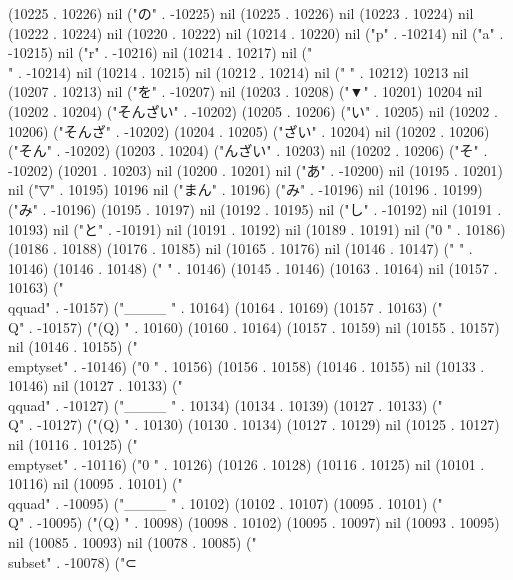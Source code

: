 (10225 . 10226) nil ("の" . -10225) nil (10225 . 10226) nil (10223 . 10224) nil (10222 . 10224) nil (10220 . 10222) nil (10214 . 10220) nil ("p" . -10214) nil ("a" . -10215) nil ("r" . -10216) nil (10214 . 10217) nil ("\\" . -10214) nil (10214 . 10215) nil (10212 . 10214) nil (" " . 10212) 10213 nil (10207 . 10213) nil ("を" . -10207) nil (10203 . 10208) ("▼" . 10201) 10204 nil (10202 . 10204) ("そんざい" . -10202) (10205 . 10206) ("い" . 10205) nil (10202 . 10206) ("そんざ" . -10202) (10204 . 10205) ("ざい" . 10204) nil (10202 . 10206) ("そん" . -10202) (10203 . 10204) ("んざい" . 10203) nil (10202 . 10206) ("そ" . -10202) (10201 . 10203) nil (10200 . 10201) nil ("あ" . -10200) nil (10195 . 10201) nil ("▽" . 10195) 10196 nil ("まん" . 10196) ("み" . -10196) nil (10196 . 10199) ("み" . -10196) (10195 . 10197) nil (10192 . 10195) nil ("し" . -10192) nil (10191 . 10193) nil ("と" . -10191) nil (10191 . 10192) nil (10189 . 10191) nil ("0
" . 10186) (10186 . 10188) (10176 . 10185) nil (10165 . 10176) nil (10146 . 10147) ("  " . 10146) (10146 . 10148) (" " . 10146) (10145 . 10146) (10163 . 10164) nil (10157 . 10163) ("\\qquad" . -10157) ("____
" . 10164) (10164 . 10169) (10157 . 10163) ("\\Q" . -10157) ("(Q)
" . 10160) (10160 . 10164) (10157 . 10159) nil (10155 . 10157) nil (10146 . 10155) ("\\emptyset" . -10146) ("0
" . 10156) (10156 . 10158) (10146 . 10155) nil (10133 . 10146) nil (10127 . 10133) ("\\qquad" . -10127) ("____
" . 10134) (10134 . 10139) (10127 . 10133) ("\\Q" . -10127) ("(Q)
" . 10130) (10130 . 10134) (10127 . 10129) nil (10125 . 10127) nil (10116 . 10125) ("\\emptyset" . -10116) ("0
" . 10126) (10126 . 10128) (10116 . 10125) nil (10101 . 10116) nil (10095 . 10101) ("\\qquad" . -10095) ("____
" . 10102) (10102 . 10107) (10095 . 10101) ("\\Q" . -10095) ("(Q)
" . 10098) (10098 . 10102) (10095 . 10097) nil (10093 . 10095) nil (10085 . 10093) nil (10078 . 10085) ("\\subset" . -10078) ("⊂
